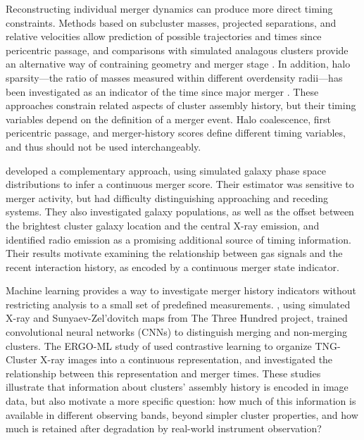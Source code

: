 Reconstructing individual merger dynamics can produce more direct timing constraints.
Methods based on subcluster masses, projected separations, and relative velocities allow prediction of possible trajectories and times since pericentric passage, and comparisons with simulated analagous clusters provide an alternative way of contraining geometry and merger stage \citep{Dawson2013, Wittman2019}.
In addition, halo sparsity---the ratio of masses measured within different overdensity radii---has been investigated as an indicator of the time since major merger \citep{RichardsonCorasaniti2022}.
These approaches constrain related aspects of cluster assembly history, but their timing variables depend on the definition of a merger event.
Halo coalescence, first pericentric passage, and merger-history scores define different timing variables, and thus should not be used interchangeably.

\cite{KongDellAntonio2026} developed a complementary approach, using simulated galaxy phase space distributions to infer a continuous merger score.
Their estimator was sensitive to merger activity, but had difficulty distinguishing approaching and receding systems.
They also investigated galaxy populations, as well as the offset between the brightest cluster galaxy location and the central X-ray emission, and identified radio emission as a promising additional source of timing information.
Their results motivate examining the relationship between gas signals and the recent interaction history, as encoded by a continuous merger state indicator.

Machine learning provides a way to investigate merger history indicators without restricting analysis to a small set of predefined measurements.
\cite{Arendt2024}, using simulated X-ray and Sunyaev-Zel'dovitch maps from The Three Hundred project, trained convolutional neural networks (CNNs) to distinguish merging and non-merging clusters.
The ERGO-ML study of \cite{Chadayammuri2026} used contrastive learning to organize TNG-Cluster X-ray images into a continuous representation, and investigated the relationship between this representation and merger times.
These studies illustrate that information about clusters' assembly history is encoded in image data, but also motivate a more specific question: how much of this information is available in different observing bands, beyond simpler cluster properties, and how much is retained after degradation by real-world instrument observation?

